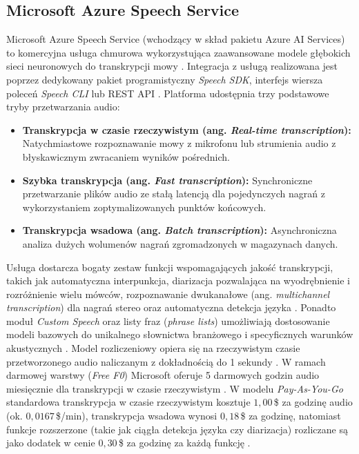 \subsection{Microsoft Azure Speech Service}
Microsoft Azure Speech Service (wchodzący w skład pakietu Azure AI Services) to komercyjna usługa chmurowa wykorzystująca zaawansowane modele głębokich sieci neuronowych do transkrypcji mowy \cite{azure_speech_overview}. Integracja z usługą realizowana jest poprzez dedykowany pakiet programistyczny \textit{Speech SDK}, interfejs wiersza poleceń \textit{Speech CLI} lub REST API \cite{azure_speech_overview}. Platforma udostępnia trzy podstawowe tryby przetwarzania audio:
\begin{itemize}
\item \textbf{Transkrypcja w czasie rzeczywistym (ang. \textit{Real-time transcription}):} Natychmiastowe rozpoznawanie mowy z mikrofonu lub strumienia audio z błyskawicznym zwracaniem wyników pośrednich.

\item \textbf{Szybka transkrypcja (ang. \textit{Fast transcription}):} Synchroniczne przetwarzanie plików audio ze stałą latencją dla pojedynczych nagrań z wykorzystaniem zoptymalizowanych punktów końcowych.

\item \textbf{Transkrypcja wsadowa (ang. \textit{Batch transcription}):} Asynchroniczna analiza dużych wolumenów nagrań zgromadzonych w magazynach danych.
\end{itemize}
Usługa dostarcza bogaty zestaw funkcji wspomagających jakość transkrypcji, takich jak automatyczna interpunkcja, diarizacja pozwalająca na wyodrębnienie i rozróżnienie wielu mówców, rozpoznawanie dwukanałowe (ang. \textit{multichannel transcription}) dla nagrań stereo oraz automatyczna detekcja języka \cite{azure_speech_overview}. Ponadto moduł \textit{Custom Speech} oraz listy fraz (\textit{phrase lists}) umożliwiają dostosowanie modeli bazowych do unikalnego słownictwa branżowego i specyficznych warunków akustycznych \cite{azure_speech_overview}. Model rozliczeniowy opiera się na rzeczywistym czasie przetworzonego audio naliczanym z dokładnością do 1 sekundy \cite{azure_speech_pricing}. W ramach darmowej warstwy (\textit{Free F0}) Microsoft oferuje 5 darmowych godzin audio miesięcznie dla transkrypcji w czasie rzeczywistym \cite{azure_speech_pricing}. W modelu \textit{Pay-As-You-Go} standardowa transkrypcja w czasie rzeczywistym kosztuje $1{,}00$\,\$ za godzinę audio (ok. $0{,}0167$\,\$/min), transkrypcja wsadowa wynosi $0{,}18$\,\$ za godzinę, natomiast funkcje rozszerzone (takie jak ciągła detekcja języka czy diarizacja) rozliczane są jako dodatek w cenie $0{,}30$\,\$ za godzinę za każdą funkcję \cite{azure_speech_pricing}.

